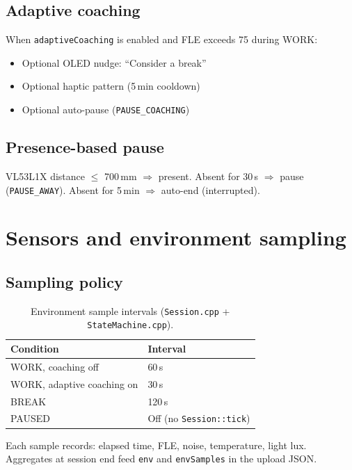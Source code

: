 \documentclass[11pt,a4paper]{report}
\newcommand{\filepath}[1]{\texttt{#1}}
\begin{document}
\section{Adaptive coaching}

When \texttt{adaptiveCoaching} is enabled and FLE exceeds 75 during WORK:
\begin{itemize}[leftmargin=*]
  \item Optional OLED nudge: ``Consider a break''
  \item Optional haptic pattern (5\,min cooldown)
  \item Optional auto-pause (\texttt{PAUSE\_COACHING})
\end{itemize}

\section{Presence-based pause}

VL53L1X distance $\leq$ 700\,mm $\Rightarrow$ present. Absent for 30\,s $\Rightarrow$ pause
(\texttt{PAUSE\_AWAY}). Absent for 5\,min $\Rightarrow$ auto-end (interrupted).

\chapter{Sensors and environment sampling}

\section{Sampling policy}

\begin{table}[h]
\centering
\caption{Environment sample intervals (\filepath{Session.cpp} + \filepath{StateMachine.cpp}).}
\begin{tabular}{@{}ll@{}}
\toprule
\textbf{Condition} & \textbf{Interval} \\
\midrule
WORK, coaching off & 60\,s \\
WORK, adaptive coaching on & 30\,s \\
BREAK & 120\,s \\
PAUSED & Off (no \texttt{Session::tick}) \\
\bottomrule
\end{tabular}
\end{table}

Each sample records: elapsed time, FLE, noise, temperature, light lux. Aggregates at
session end feed \texttt{env} and \texttt{envSamples} in the upload JSON.
\end{document}

